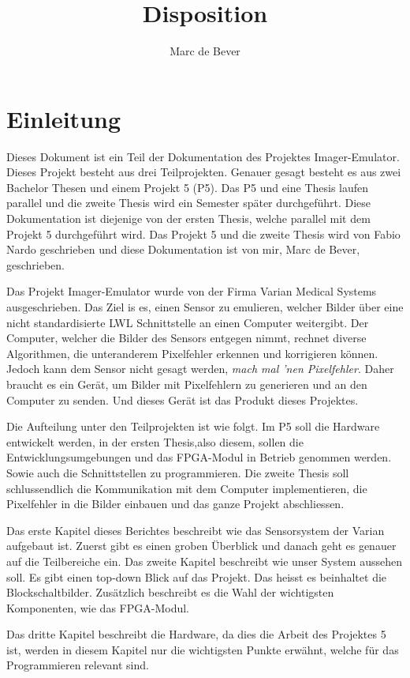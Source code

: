 \documentclass{article}
\title{Disposition}
\author{Marc de Bever}
\begin{document}
\maketitle
\section{Einleitung}
Dieses Dokument ist ein Teil der Dokumentation des Projektes Imager-Emulator. Dieses Projekt besteht aus drei Teilprojekten. Genauer gesagt besteht es aus zwei Bachelor Thesen und einem Projekt 5 (P5). Das P5 und eine Thesis laufen parallel und die zweite Thesis wird ein Semester später durchgeführt. Diese Dokumentation ist diejenige von der ersten Thesis, welche parallel mit dem Projekt 5 durchgeführt wird. Das Projekt 5 und die zweite Thesis wird von Fabio Nardo geschrieben und diese Dokumentation ist von mir, Marc de Bever, geschrieben. 

Das Projekt Imager-Emulator wurde von der Firma Varian Medical Systems ausgeschrieben. Das Ziel is es, einen Sensor zu emulieren, welcher Bilder über eine nicht standardisierte LWL Schnittstelle an einen Computer weitergibt. Der Computer, welcher die Bilder des Sensors entgegen nimmt, rechnet diverse Algorithmen, die unteranderem Pixelfehler erkennen und korrigieren können. Jedoch kann dem Sensor nicht gesagt werden, \textit{mach mal 'nen Pixelfehler}. Daher braucht es ein Gerät, um Bilder mit Pixelfehlern zu generieren und an den Computer zu senden. Und dieses Gerät ist das Produkt dieses Projektes.

Die Aufteilung unter den Teilprojekten ist wie folgt. Im P5 soll die Hardware entwickelt werden, in der ersten Thesis,also diesem, sollen die Entwicklungsumgebungen und das FPGA-Modul in Betrieb genommen werden. Sowie auch die Schnittstellen zu programmieren. Die zweite Thesis soll schlussendlich die Kommunikation mit dem Computer implementieren, die Pixelfehler in die Bilder einbauen und das ganze Projekt abschliessen.

Das erste Kapitel dieses Berichtes beschreibt wie das Sensorsystem der Varian aufgebaut ist. Zuerst gibt es einen groben Überblick und danach geht es genauer auf die Teilbereiche ein.
Das zweite Kapitel beschreibt wie unser System aussehen soll. Es gibt einen top-down Blick auf das Projekt. Das heisst es beinhaltet die Blockschaltbilder. Zusätzlich beschreibt es die Wahl der wichtigsten Komponenten, wie das FPGA-Modul.

Das dritte Kapitel beschreibt die Hardware, da dies die Arbeit des Projektes 5 ist, werden in diesem Kapitel nur die wichtigsten Punkte erwähnt, welche für das Programmieren relevant sind.
\end{document}
